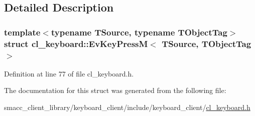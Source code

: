 \subsection{Detailed Description}
\subsubsection*{template$<$typename T\+Source, typename T\+Object\+Tag$>$\newline
struct cl\+\_\+keyboard\+::\+Ev\+Key\+Press\+M$<$ T\+Source, T\+Object\+Tag $>$}



Definition at line 77 of file cl\+\_\+keyboard.\+h.



The documentation for this struct was generated from the following file\+:\begin{DoxyCompactItemize}
\item 
smacc\+\_\+client\+\_\+library/keyboard\+\_\+client/include/keyboard\+\_\+client/\hyperlink{cl__keyboard_8h}{cl\+\_\+keyboard.\+h}\end{DoxyCompactItemize}
